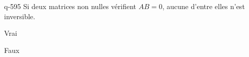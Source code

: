 \begin{truefalse}{q-595}
Si deux matrices non nulles vérifient $AB=0$, aucune d'entre elles n'est inversible.
\item* Vrai
\item Faux
\end{truefalse}

